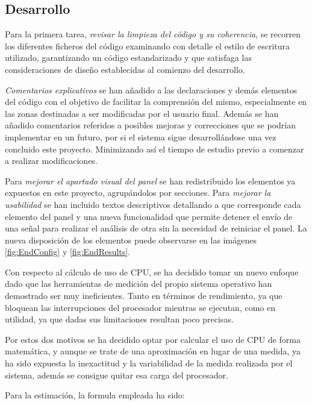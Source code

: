     \subsection{Desarrollo}
    
        Para la primera tarea, \textit{revisar la limpieza del código y su coherencia}, se recorren los diferentes ficheros del código examinando con detalle el estilo de escritura utilizado, garantizando un código estandarizado y que satisfaga las consideraciones de diseño establecidas al comienzo del desarrollo.
        
       \textit{Comentarios explicativos} se han añadido a las declaraciones y demás elementos del código con el objetivo de facilitar la comprensión del mismo, especialmente en las zonas destinadas a ser modificadas por el usuario final. Además se han añadido comentarios referidos a posibles mejoras y correcciones que se podrían implementar en un futuro, por si el sistema sigue desarrollándose una vez concluido este proyecto. Minimizando así el tiempo de estudio previo a comenzar a realizar modificaciones.
       
       Para \textit{mejorar el apartado visual del panel} se han redistribuido los elementos ya expuestos en este proyecto, agrupándolos por secciones. Para \textit{mejorar la usabilidad} se han incluido textos descriptivos detallando a que corresponde cada elemento del panel y una nueva funcionalidad que permite detener el envío de una señal para realizar el análisis de otra sin la necesidad de reiniciar el panel. La nueva disposición de los elementos puede observarse en las imágenes \ref{fig:EndConfig} y \ref{fig:EndResults}.
        
        Con respecto al cálculo de uso de CPU, se ha decidido tomar un nuevo enfoque dado que las herramientas de medición del propio sistema operativo han demostrado ser muy ineficientes. Tanto en términos de rendimiento, ya que bloquean las interrupciones del procesador mientras se ejecutan, como en utilidad, ya que dadas sus limitaciones resultan poco precisas.
        
        Por estos dos motivos se ha decidido optar por calcular el uso de CPU de forma matemática, y aunque se trate de una aproximación en lugar de una medida, ya ha sido expuesta la inexactitud y la variabilidad de la medida realizada por el sistema, además se consigue quitar esa carga del procesador. 
        
        Para la estimación, la formula empleada ha sido:
        
